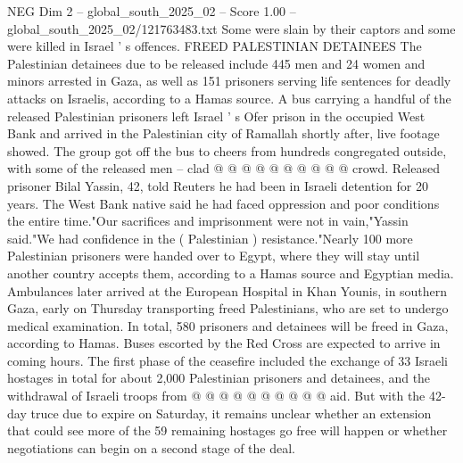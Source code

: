 \begin{textsample}{NEG Dim 2 – global\_south\_2025\_02 – Score 1.00 – global\_south\_2025\_02/121763483.txt}
Some were slain by their captors and some were killed in Israel ' s offences.
FREED PALESTINIAN DETAINEES The Palestinian detainees due to be released include 445 men and 24 women and minors arrested in Gaza, as well as 151 prisoners serving life sentences for deadly attacks on Israelis, according to a Hamas source.
A bus carrying a handful of the released Palestinian prisoners left Israel ' s Ofer prison in the occupied West Bank and arrived in the Palestinian city of Ramallah shortly after, live footage showed.
The group got off the bus to cheers from hundreds congregated outside, with some of the released men -- clad @ @ @ @ @ @ @ @ @ @ crowd.
Released prisoner Bilal Yassin, 42, told Reuters he had been in Israeli detention for 20 years.
The West Bank native said he had faced oppression and poor conditions the entire time."Our sacrifices and imprisonment were not in vain,"Yassin said."We had confidence in the ( Palestinian ) resistance."Nearly 100 more Palestinian prisoners were handed over to Egypt, where they will stay until another country accepts them, according to a Hamas source and Egyptian media.
Ambulances later arrived at the European Hospital in Khan Younis, in southern Gaza, early on Thursday transporting freed Palestinians, who are set to undergo medical examination.
In total, 580 prisoners and detainees will be freed in Gaza, according to Hamas.
Buses escorted by the Red Cross are expected to arrive in coming hours.
The first phase of the ceasefire included the exchange of 33 Israeli hostages in total for about 2,000 Palestinian prisoners and detainees, and the withdrawal of Israeli troops from @ @ @ @ @ @ @ @ @ @ aid.
But with the 42-day truce due to expire on Saturday, it remains unclear whether an extension that could see more of the 59 remaining hostages go free will happen or whether negotiations can begin on a second stage of the deal.

\end{textsample}
